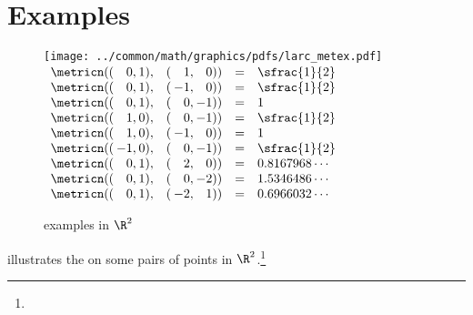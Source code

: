 \section{Examples}
\begin{figure}
  \centering%
  \gsize%
  \texttt{[image: ../common/math/graphics/pdfs/larc\_metex.pdf]}
  \hspace{10mm}
  $\begin{array}[b]{l @{\hspace{2pt}}r@{\hspace{2pt}}r l @{\hspace{2pt}}r@{\hspace{2pt}}r cl}
    \metricn((& 0,& 1),&(& 1,& 0)) &=& \sfrac{1}{2}    \\
    \metricn((& 0,& 1),&(&-1,& 0)) &=& \sfrac{1}{2}    \\
    \metricn((& 0,& 1),&(& 0,&-1)) &=& 1               \\
    \metricn((& 1,& 0),&(& 0,&-1)) &=& \sfrac{1}{2}    \\
    \metricn((& 1,& 0),&(&-1,& 0)) &=& 1               \\
    \metricn((&-1,& 0),&(& 0,&-1)) &=& \sfrac{1}{2}    \\
    \metricn((& 0,& 1),&(& 2,& 0)) &=& 0.8167968\cdots \\
    \metricn((& 0,& 1),&(& 0,&-2)) &=& 1.5346486\cdots \\
    \metricn((& 0,& 1),&(&-2,& 1)) &=& 0.6966032\cdots
  \end{array}$
  \caption{ examples in $\R^2$\label{fig:larcmet}}
\end{figure}


\begin{example}
\label{ex:larcR2}
 illustrates the  on some pairs of points in $\R^2$.\footnote{}
\end{example}


